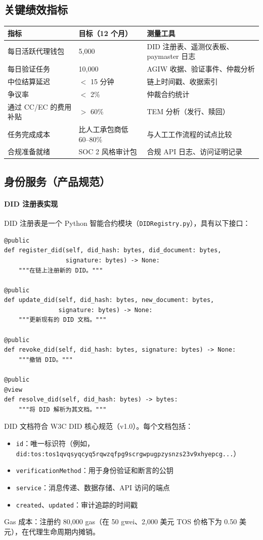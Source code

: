 \documentclass[11pt]{article}
\begin{document}
\subsection{关键绩效指标}
\begin{longtable}{@{}p{}p{}p{}@{}}
\toprule
\textbf{指标} & \textbf{目标（12 个月）} & \textbf{测量工具} \\\midrule
每日活跃代理钱包 & 5,000 & DID 注册表、遥测仪表板、paymaster 日志 \\
每日验证任务 & 10,000 & AGIW 收据、验证事件、仲裁分析 \\
中位结算延迟 & $<$ 15 分钟 & 链上时间戳、收据索引 \\
争议率 & $<$ 2\% & 仲裁合约统计 \\
通过 CC/EC 的费用补贴 & $>$ 60\% & TEM 分析（发行、赎回） \\
任务完成成本 & 比人工承包商低 60--80\% & 与人工工作流程的试点比较 \\
合规准备就绪 & SOC 2 风格审计包 & 合规 API 日志、访问证明记录 \\
\bottomrule
\end{longtable}

\subsection{身份服务（产品规范）}
\label{sec:identity-spec}
\paragraph{DID 注册表实现} DID 注册表是一个 Python 智能合约模块（\texttt{DIDRegistry.py}），具有以下接口：
\begin{verbatim}
@public
def register_did(self, did_hash: bytes, did_document: bytes,
                 signature: bytes) -> None:
    """在链上注册新的 DID。"""

@public
def update_did(self, did_hash: bytes, new_document: bytes,
               signature: bytes) -> None:
    """更新现有的 DID 文档。"""

@public
def revoke_did(self, did_hash: bytes, signature: bytes) -> None:
    """撤销 DID。"""

@public
@view
def resolve_did(self, did_hash: bytes) -> bytes:
    """将 DID 解析为其文档。"""
\end{verbatim}
DID 文档符合 W3C DID 核心规范（v1.0）。每个文档包括：
\begin{itemize}[noitemsep]
  \item \texttt{id}：唯一标识符（例如，\texttt{did:tos:tos1qvqsyqcyq5rqwzqfpg9scrgwpugpzysnzs23v9xhyepcg...}）
  \item \texttt{verificationMethod}：用于身份验证和断言的公钥
  \item \texttt{service}：消息传递、数据存储、API 访问的端点
  \item \texttt{created}、\texttt{updated}：审计追踪的时间戳
\end{itemize}
Gas 成本：注册约 80,000 gas（在 50 gwei、2,000 美元 TOS 价格下为 0.50 美元），在代理生命周期内摊销。
\end{document}
